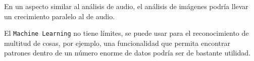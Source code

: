 \documentclass[a4paper, 12pt]{book}
\begin{document}
En un aspecto similar al análisis de audio, el análisis de imágenes podría llevar un crecimiento paralelo al de audio.

El \texttt{Machine Learning} no tiene límites, se puede usar para el reconocimiento de multitud de cosas, por ejemplo, una funcionalidad que permita encontrar patrones dentro de un número enorme de datos podría ser de bastante utilidad.


\cleardoublepage


\end{document}
